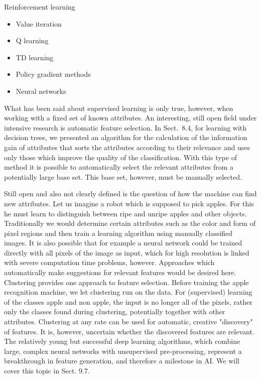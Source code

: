 \documentclass[10pt]{book}
\begin{document}
Reinforcement learning

\begin{itemize}
  \item Value iteration
  \item Q learning
  \item TD learning
  \item Policy gradient methods
  \item Neural networks
\end{itemize}

What has been said about supervised learning is only true, however, when working with a fixed set of known attributes. An interesting, still open field under intensive research is automatic feature selection. In Sect.\ 8.4, for learning with decision trees, we presented an algorithm for the calculation of the information gain of attributes that sorts the attributes according to their relevance and uses only those which improve the quality of the classification. With this type of method it is possible to automatically select the relevant attributes from a potentially large base set. This base set, however, must be manually selected.

Still open and also not clearly defined is the question of how the machine can find new attributes. Let us imagine a robot which is supposed to pick apples. For this he must learn to distinguish between ripe and unripe apples and other objects. Traditionally we would determine certain attributes such as the color and form of pixel regions and then train a learning algorithm using manually classified images. It is also possible that for example a neural network could be trained directly with all pixels of the image as input, which for high resolution is linked with severe computation time problems, however. Approaches which automatically make suggestions for relevant features would be desired here.
Clustering provides one approach to feature selection. Before training the apple recognition machine, we let clustering run on the data. For (supervised) learning of the classes apple and non apple, the input is no longer all of the pixels, rather only the classes found during clustering, potentially together with other attributes. Clustering at any rate can be used for automatic, creative "discovery" of features. It is, however, uncertain whether the discovered features are relevant. The relatively young but successful deep learning algorithms, which combine large, complex neural networks with unsupervised pre-processing, represent a breakthrough in feature generation, and therefore a milestone in AI. We will cover this topic in Sect. 9.7.
\end{document}
